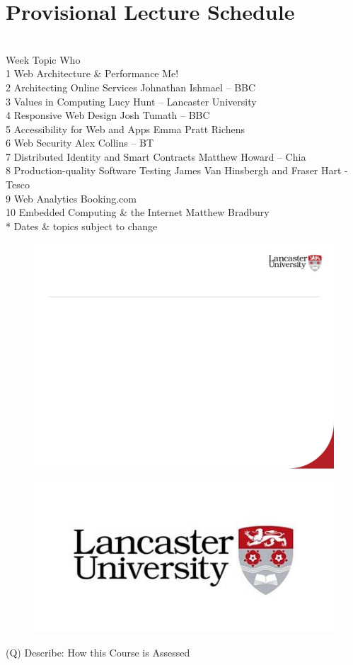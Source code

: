 \documentclass[12pt]{article}
\begin{document}
\section{Provisional Lecture Schedule}
\\
Week Topic Who\\
1 Web Architecture \& Performance Me!\\
2 Architecting Online Services Johnathan Ishmael – BBC\\
3 Values in Computing Lucy Hunt – Lancaster University\\
4 Responsive Web Design Josh Tumath – BBC\\
5 Accessibility for Web and Apps Emma Pratt Richens\\
6 Web Security Alex Collins – BT\\
7 Distributed Identity and Smart Contracts Matthew Howard – Chia\\
8 Production-quality Software Testing James Van Hinsbergh and Fraser Hart - Tesco\\
9 Web Analytics Booking.com\\
10 Embedded Computing \& the Internet Matthew Bradbury\\
* Dates \& topics subject to change\\
\begin{figure}[H]
\includegraphics[width=0.5\linewidth]{page6-image-1.png}
\end{figure}
\begin{figure}[H]
\includegraphics[width=0.5\linewidth]{page6-image-2.png}
\end{figure}
\clearpage
(Q)
Describe: How this Course is Assessed
\clearpage
\end{document}
